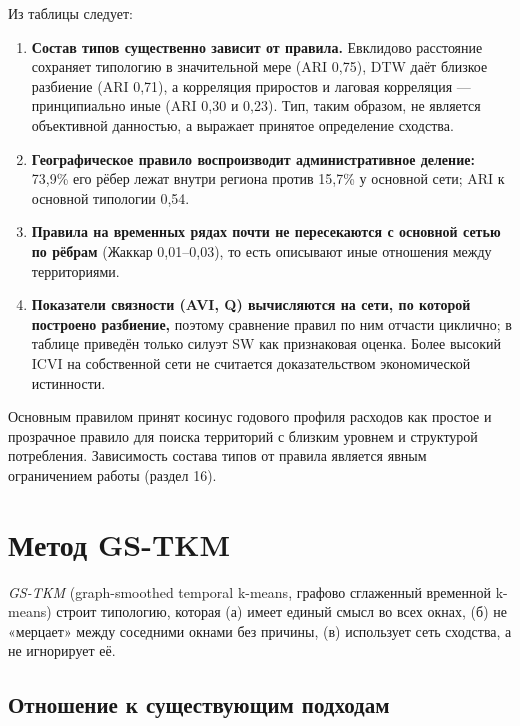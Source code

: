 \documentclass[11pt,a4paper]{article}
\providecommand{\tightlist}{\setlength{\itemsep}{1pt}\setlength{\parskip}{0pt}}
\begin{document}
\endgroup

Из таблицы следует:

\begin{enumerate}
\def\labelenumi{\arabic{enumi}.}
\tightlist
\item
  \textbf{Состав типов существенно зависит от правила.} Евклидово расстояние сохраняет типологию в значительной мере (ARI 0,75), DTW даёт близкое разбиение (ARI 0,71), а корреляция приростов и лаговая корреляция --- принципиально иные (ARI 0,30 и 0,23). Тип, таким образом, не является объективной данностью, а выражает принятое определение сходства.
\item
  \textbf{Географическое правило воспроизводит административное деление:} 73,9\% его рёбер лежат внутри региона против 15,7\% у основной сети; ARI к основной типологии 0,54.
\item
  \textbf{Правила на временных рядах почти не пересекаются с основной сетью по рёбрам} (Жаккар 0,01--0,03), то есть описывают иные отношения между территориями.
\item
  \textbf{Показатели связности (AVI, Q) вычисляются на сети, по которой построено разбиение,} поэтому сравнение правил по ним отчасти циклично; в таблице приведён только силуэт SW как признаковая оценка. Более высокий ICVI на собственной сети не считается доказательством экономической истинности.
\end{enumerate}

Основным правилом принят косинус годового профиля расходов как простое и прозрачное правило для поиска территорий с близким уровнем и структурой потребления. Зависимость состава типов от правила является явным ограничением работы (раздел 16).

\section{Метод GS-TKM}\label{ux43cux435ux442ux43eux434-gs-tkm}

\emph{GS-TKM} (graph-smoothed temporal k-means, графово сглаженный временной k-means) строит типологию, которая (а) имеет единый смысл во всех окнах, (б) не «мерцает» между соседними окнами без причины, (в) использует сеть сходства, а не игнорирует её.

\subsection{Отношение к существующим подходам}\label{ux43eux442ux43dux43eux448ux435ux43dux438ux435-ux43a-ux441ux443ux449ux435ux441ux442ux432ux443ux44eux449ux438ux43c-ux43fux43eux434ux445ux43eux434ux430ux43c}
\end{document}
